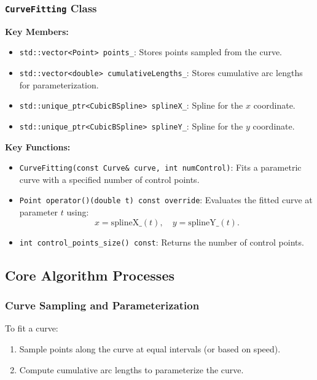 \documentclass[a4paper]{article}
\begin{document}
\subsubsection{\texttt{CurveFitting} Class}

\textbf{Key Members:}
\begin{itemize}
    \item \texttt{std::vector<Point> points\_}: Stores points sampled from the curve.
    \item \texttt{std::vector<double> cumulativeLengths\_}: Stores cumulative arc lengths for parameterization.
    \item \texttt{std::unique\_ptr<CubicBSpline> splineX\_}: Spline for the $x$ coordinate.
    \item \texttt{std::unique\_ptr<CubicBSpline> splineY\_}: Spline for the $y$ coordinate.
\end{itemize}

\textbf{Key Functions:}
\begin{itemize}
    \item \texttt{CurveFitting(const Curve\& curve, int numControl)}:
    Fits a parametric curve with a specified number of control points.
    \item \texttt{Point operator()(double t) const override}:
    Evaluates the fitted curve at parameter $t$ using:
    \[
    x = \text{splineX\_}(t), \quad y = \text{splineY\_}(t).
    \]
    \item \texttt{int control\_points\_size() const}:
    Returns the number of control points.
\end{itemize}


\subsection{Core Algorithm Processes}

\subsubsection{Curve Sampling and Parameterization}

To fit a curve:
\begin{enumerate}
    \item Sample points along the curve at equal intervals (or based on speed).
    \item Compute cumulative arc lengths to parameterize the curve.
\end{enumerate}
\end{document}
